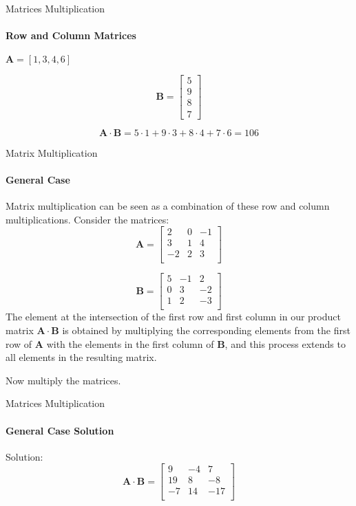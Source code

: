 \documentclass{beamer}
\begin{document}
\begin{frame}{Matrices Multiplication}
\framesubtitle{Row and Column Matrices}
\begin{center}
    \(\mathbf{A} = [1, 3, 4, 6]\) 
\end{center}

\[
\mathbf{B} =
\begin{bmatrix}
    5 \\
    9 \\
    8 \\
    7
\end{bmatrix}
\]

\[
\mathbf{A} \cdot \mathbf{B} = 5 \cdot 1 + 9 \cdot 3 + 8 \cdot 4 + 7 \cdot 6 = 106
\]   
\end{frame}

\begin{frame}{Matrix Multiplication}
\framesubtitle{General Case}
Matrix multiplication can be seen as a combination of these row and column multiplications.
Consider the matrices:
\[
\mathbf{A} =
\begin{bmatrix}
    2 & 0 & -1 \\
    3 & 1 & 4 \\
    -2 & 2 & 3 \\
\end{bmatrix}
\]

\[
\mathbf{B} =
\begin{bmatrix}
    5 & -1 & 2 \\
    0 & 3 & -2 \\
    1 & 2 & -3 \\
\end{bmatrix}
\]
The element at the intersection of the first row and first column in our product matrix $\mathbf{A} \cdot \mathbf{B}$ is obtained by multiplying the corresponding elements from the first row of $\mathbf{A}$ with the elements in the first column of $\mathbf{B}$, and this process extends to all elements in the resulting matrix.

Now multiply the matrices.
\end{frame}

\begin{frame}{Matrices Multiplication}
\framesubtitle{General Case Solution}
Solution: \[
\mathbf{A} \cdot \mathbf{B} =
\begin{bmatrix}
    9 & -4 & 7 \\
    19 & 8 & -8 \\
    -7 & 14 & -17 \\
\end{bmatrix}
\]
\end{frame}
\end{document}
